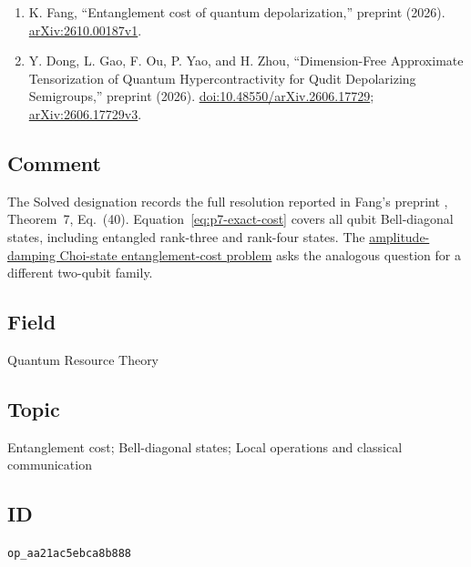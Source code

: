 \begin{enumerate}[label={},leftmargin=4.8em,labelsep=0.5em]
  \item[\textup{[Fan26]}]\label{ref:p7-fang}
  K. Fang, ``Entanglement cost of quantum depolarization,''
  preprint (2026).
  \href{https://arxiv.org/abs/2610.00187v1}{arXiv:2610.00187v1}.

  \item[\textup{[DGO+26]}]\label{ref:p7-dong-et-al}
  Y. Dong, L. Gao, F. Ou, P. Yao, and H. Zhou,
  ``Dimension-Free Approximate Tensorization of Quantum Hypercontractivity
  for Qudit Depolarizing Semigroups,'' preprint (2026).
  \href{https://doi.org/10.48550/arXiv.2606.17729}{doi:10.48550/arXiv.2606.17729};
  \href{https://arxiv.org/abs/2606.17729v3}{arXiv:2606.17729v3}.
\end{enumerate}

\subsection*{Comment}

The Solved designation records the full resolution reported in Fang's
preprint , Theorem~7, Eq.~(40).
Equation~\eqref{eq:p7-exact-cost} covers all qubit Bell-diagonal states,
including entangled rank-three and rank-four states.
The \href{https://qiqc-op.com/problem/op_7a9051ff6d0a1739/}{amplitude-damping Choi-state entanglement-cost problem}
asks the analogous question for a different two-qubit family.

\subsection*{Field}

Quantum Resource Theory

\subsection*{Topic}

Entanglement cost; Bell-diagonal states; Local operations and classical communication

\subsection*{ID}

\texttt{op\_aa21ac5ebca8b888}

